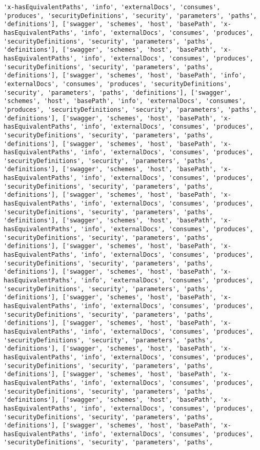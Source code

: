 \documentclass[11pt]{article}
\begin{document}
\begin{Verbatim}[commandchars=\\\{\}]
'x-hasEquivalentPaths', 'info', 'externalDocs', 'consumes', 'produces', 'securityDefinitions', 'security', 'parameters', 'paths', 'definitions'], ['swagger', 'schemes', 'host', 'basePath', 'x-hasEquivalentPaths', 'info', 'externalDocs', 'consumes', 'produces', 'securityDefinitions', 'security', 'parameters', 'paths', 'definitions'], ['swagger', 'schemes', 'host', 'basePath', 'x-hasEquivalentPaths', 'info', 'externalDocs', 'consumes', 'produces', 'securityDefinitions', 'security', 'parameters', 'paths', 'definitions'], ['swagger', 'schemes', 'host', 'basePath', 'info', 'externalDocs', 'consumes', 'produces', 'securityDefinitions', 'security', 'parameters', 'paths', 'definitions'], ['swagger', 'schemes', 'host', 'basePath', 'info', 'externalDocs', 'consumes', 'produces', 'securityDefinitions', 'security', 'parameters', 'paths', 'definitions'], ['swagger', 'schemes', 'host', 'basePath', 'x-hasEquivalentPaths', 'info', 'externalDocs', 'consumes', 'produces', 'securityDefinitions', 'security', 'parameters', 'paths', 'definitions'], ['swagger', 'schemes', 'host', 'basePath', 'x-hasEquivalentPaths', 'info', 'externalDocs', 'consumes', 'produces', 'securityDefinitions', 'security', 'parameters', 'paths', 'definitions'], ['swagger', 'schemes', 'host', 'basePath', 'x-hasEquivalentPaths', 'info', 'externalDocs', 'consumes', 'produces', 'securityDefinitions', 'security', 'parameters', 'paths', 'definitions'], ['swagger', 'schemes', 'host', 'basePath', 'x-hasEquivalentPaths', 'info', 'externalDocs', 'consumes', 'produces', 'securityDefinitions', 'security', 'parameters', 'paths', 'definitions'], ['swagger', 'schemes', 'host', 'basePath', 'x-hasEquivalentPaths', 'info', 'externalDocs', 'consumes', 'produces', 'securityDefinitions', 'security', 'parameters', 'paths', 'definitions'], ['swagger', 'schemes', 'host', 'basePath', 'x-hasEquivalentPaths', 'info', 'externalDocs', 'consumes', 'produces', 'securityDefinitions', 'security', 'parameters', 'paths', 'definitions'], ['swagger', 'schemes', 'host', 'basePath', 'x-hasEquivalentPaths', 'info', 'externalDocs', 'consumes', 'produces', 'securityDefinitions', 'security', 'parameters', 'paths', 'definitions'], ['swagger', 'schemes', 'host', 'basePath', 'x-hasEquivalentPaths', 'info', 'externalDocs', 'consumes', 'produces', 'securityDefinitions', 'security', 'parameters', 'paths', 'definitions'], ['swagger', 'schemes', 'host', 'basePath', 'x-hasEquivalentPaths', 'info', 'externalDocs', 'consumes', 'produces', 'securityDefinitions', 'security', 'parameters', 'paths', 'definitions'], ['swagger', 'schemes', 'host', 'basePath', 'x-hasEquivalentPaths', 'info', 'externalDocs', 'consumes', 'produces', 'securityDefinitions', 'security', 'parameters', 'paths', 'definitions'], ['swagger', 'schemes', 'host', 'basePath', 'x-hasEquivalentPaths', 'info', 'externalDocs', 'consumes', 'produces', 'securityDefinitions', 'security', 'parameters', 'paths', 'definitions'], ['swagger', 'schemes', 'host', 'basePath', 'x-hasEquivalentPaths', 'info', 'externalDocs', 'consumes', 'produces', 'securityDefinitions', 'security', 'parameters', 'paths', 'definitions'], ['swagger', 'schemes', 'host', 'basePath', 'x-hasEquivalentPaths', 'info', 'externalDocs', 'consumes', 'produces', 'securityDefinitions', 'security', 'parameters', 'paths', 
\end{Verbatim}
\end{document}
